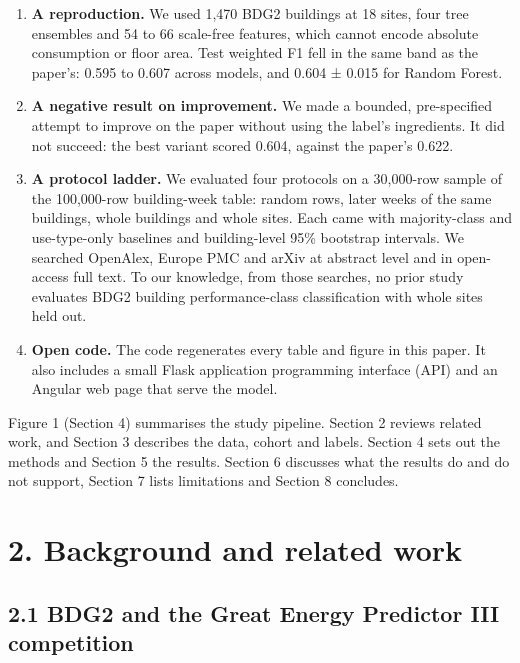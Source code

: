 \documentclass[
  10pt,
]{article}
\providecommand{\tightlist}{%
  \setlength{\itemsep}{0pt}\setlength{\parskip}{0pt}}
\begin{document}
\begin{enumerate}
\def\labelenumi{\arabic{enumi}.}
\tightlist
\item
  \textbf{A reproduction.} We used 1,470 BDG2 buildings at 18 sites,
  four tree ensembles and 54 to 66 scale-free features, which cannot
  encode absolute consumption or floor area. Test weighted F1 fell in
  the same band as the paper's: 0.595 to 0.607 across models, and 0.604
  ± 0.015 for Random Forest.
\item
  \textbf{A negative result on improvement.} We made a bounded,
  pre-specified attempt to improve on the paper without using the
  label's ingredients. It did not succeed: the best variant scored
  0.604, against the paper's 0.622.
\item
  \textbf{A protocol ladder.} We evaluated four protocols on a
  30,000-row sample of the 100,000-row building-week table: random rows,
  later weeks of the same buildings, whole buildings and whole sites.
  Each came with majority-class and use-type-only baselines and
  building-level 95\% bootstrap intervals. We searched OpenAlex, Europe
  PMC and arXiv at abstract level and in open-access full text. To our
  knowledge, from those searches, no prior study evaluates BDG2 building
  performance-class classification with whole sites held out.
\item
  \textbf{Open code.} The code regenerates every table and figure in
  this paper. It also includes a small Flask application programming
  interface (API) and an Angular web page that serve the model.
\end{enumerate}

Figure 1 (Section 4) summarises the study pipeline. Section 2 reviews
related work, and Section 3 describes the data, cohort and labels.
Section 4 sets out the methods and Section 5 the results. Section 6
discusses what the results do and do not support, Section 7 lists
limitations and Section 8 concludes.

\hypertarget{background-and-related-work}{%
\section{2. Background and related
work}\label{background-and-related-work}}

\hypertarget{bdg2-and-the-great-energy-predictor-iii-competition}{%
\subsection{2.1 BDG2 and the Great Energy Predictor III
competition}\label{bdg2-and-the-great-energy-predictor-iii-competition}}
\end{document}
